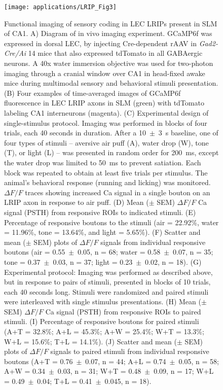 \begin{figure}
	\centering
	\texttt{[image: applications/LRIP\_Fig3]}
	\caption[Functional imaging of sensory coding in LEC LRIPs present in SLM of CA1]{Functional imaging of sensory coding in LEC LRIPs present in SLM of CA1.
	A) Diagram of in vivo imaging experiment. GCaMP6f was expressed in dorsal LEC, by injecting Cre-dependent rAAV in \emph{Gad2-Cre/Ai} 14 mice that also expressed tdTomato in all GABAergic neurons. A 40x water immersion objective was used for two-photon imaging through a cranial window over CA1 in head-fixed awake mice during multimodal sensory and behavioral stimuli presentation.
	(B) Four examples of time-averaged images of GCaMP6f fluorescence in LEC LRIP axons in SLM (green) with tdTomato labeling CA1 interneurons (magenta).
	(C) Experimental design of single-stimulus protocol. Imaging was performed in blocks of four trials, each 40 seconds in duration. After a 10~$\pm$~3~s baseline, one of four types of stimuli -- aversive air puff (A), water drop (W), tone (T), or light (L) -- was presented in random order for 200~ms, except the water drop was limited to 50~ms to prevent satiation. Each block was repeated to obtain at least five trials per stimulus. The animal's behavioral response (running and licking) was monitored. $\Delta F/F$ traces showing increased Ca signal in a single bouton on an LRIP axon in response to air puff.
	(D) Mean ($\pm$ SEM) $\Delta F/F$ Ca signal (PSTH) from responsive ROIs to indicated stimuli.
	(E) Percentage of responsive boutons to the stimuli (air = 22.92\%, water = 11.96\%, tone = 13.64\%, and light = 5.65\%).
	(F) Scatter and mean ($\pm$ SEM) plots of $\Delta F/F$ signals from individual responsive boutons (air = 0.55~$\pm$~0.05, n = 68; water = 0.58~$\pm$~0.07, n = 35; tone = 0.37~$\pm$~0.03, n = 37; light = 0.23~$\pm$~0.02, n = 18).
	(G) Experimental protocol: Imaging was performed as described above, but in response to pairs of stimuli, presented in blocks of 10 trials, each 40 seconds long. Stimuli were randomized and paired stimuli were interleaved with single stimulus presentations.
	(H) Mean ($\pm$ SEM) $\Delta F/F$ Ca signal (PSTH) from responsive ROIs to paired stimuli.
	(I) Percentage of responsive boutons for paired stimuli (A+T = 32.8\%; A+L = 45.3\%; A+W = 25.4\%; W+T = 13.3\%; W+L = 15.6\%; T+L = 14.1\%).
	(J) Scatter and mean ($\pm$ SEM) plots of $\Delta F/F$ signals to paired stimuli from individual responsive boutons (A+T = 0.76~$\pm$~0.07, n = 44; A+L = 0.74~$\pm$~0.05, n = 58; A+W = 0.34~$\pm$~0.03, n = 31; W+T = 0.48~$\pm$~0.09, n = 17; W+L = 0.49~$\pm$~0.04; T+L = 0.41~$\pm$~0.045, n = 18).}
	\label{fig:applications:LRIP:imaging}
\end{figure}

